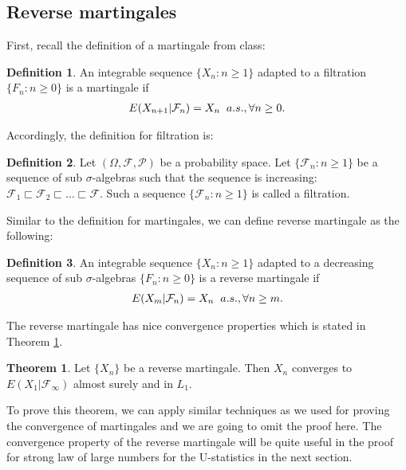 \documentclass{article}
\theoremstyle{definition}
\newtheorem{theorem}{Theorem}
\newtheorem{Def}{Definition}
\numberwithin{Def}{section}
\begin{document}
\subsection{Reverse martingales}
First, recall the definition of a martingale from class:
\begin{Def}
An integrable sequence $\{X_n: n\ge 1\}$ adapted to a filtration $\{F_n: n\ge 0\}$ is a martingale if
\begin{align*}
 E(X_{n+1}|\mathcal{F}_n)=X_n \hspace{0.2cm} a.s., \forall n\ge0.
\end{align*}
\end{Def}
Accordingly, the definition for filtration is:
\begin{Def}
Let $(\Omega, \mathcal{F}, \mathcal{P})$ be a probability space. Let $\{\mathcal{F}_n: n\ge1\}$ be a sequence of sub $\sigma$-algebras such that the sequence is increasing: $\mathcal{F}_1 \sqsubset \mathcal{F}_2 \sqsubset \dotsc \sqsubset \mathcal{F}$. Such a sequence $\{\mathcal{F}_n: n\ge1\}$ is called a filtration. 
\end{Def}

Similar to the definition for martingales, we can define reverse martingale as the following:
\begin{Def}
An integrable sequence $\{X_n: n\ge 1\}$ adapted to a decreasing sequence of sub $\sigma$-algebras $\{F_n: n\ge 0\}$ is a reverse martingale if
\begin{align*}
 E(X_m|\mathcal{F}_n)=X_n \hspace{0.2cm} a.s., \forall n\ge m.
\end{align*}
\end{Def}

The reverse martingale has nice convergence properties which is stated in Theorem \ref{conv_rm}.
\begin{theorem}\label{conv_rm}
Let $\{X_n\}$ be a reverse martingale. Then $X_n$ converges to $E(X_1|\mathcal{F}_{\infty})$ almost surely and in $L_1$. 
\end{theorem}
To prove this theorem, we can apply similar techniques as we used for proving the convergence of martingales and we are going to omit the proof here. The convergence property of the reverse martingale will be quite useful in the proof for strong law of large numbers for the U-statistics in the next section.
\end{document}
